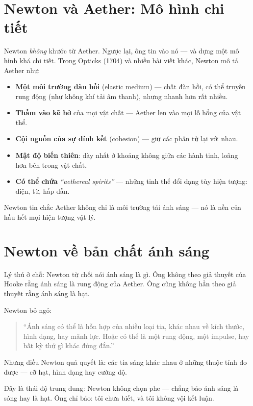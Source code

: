 \section{Newton và Aether: Mô hình chi tiết}

Newton \emph{không} khước từ Aether. Ngược lại, ông tin vào nó — và dựng một mô hình khá chi tiết. Trong Opticks (1704) và nhiều bài viết khác, Newton mô tả Aether như:
\begin{itemize}
  \item \textbf{Một môi trường đàn hồi} (elastic medium) — chất đàn hồi, có thể truyền rung động (như không khí tải âm thanh), nhưng nhanh hơn rất nhiều.
  \item \textbf{Thấm vào kẽ hở} của mọi vật chất — Aether len vào mọi lỗ hổng của vật thể.
  \item \textbf{Cội nguồn của sự dính kết} (cohesion) — giữ các phân tử lại với nhau.
  \item \textbf{Mật độ biến thiên}: dày nhất ở khoảng không giữa các hành tinh, loãng hơn bên trong vật chất.
  \item \textbf{Có thể chứa} \emph{``aethereal spirits''} — những tinh thể đổi dạng tùy hiện tượng: điện, từ, hấp dẫn.
\end{itemize}

Newton tin chắc Aether không chỉ là môi trường tải ánh sáng — nó là nền của hầu hết mọi hiện tượng vật lý.


\section{Newton về bản chất ánh sáng}

Lý thú ở chỗ: Newton từ chối nói ánh sáng là gì. Ông không theo giả thuyết của Hooke rằng ánh sáng là rung động của Aether. Ông cũng không hẳn theo giả thuyết rằng ánh sáng là hạt.

Newton bỏ ngỏ:
\begin{quote}
“Ánh sáng có thể là hỗn hợp của nhiều loại tia, khác nhau về kích thước, hình dạng, hay mãnh lực. Hoặc có thể là một rung động, một impulse, hay bất kỳ thứ gì khác đúng đắn.”
\end{quote}

Nhưng điều Newton quả quyết là: các tia sáng khác nhau ở những thuộc tính đo được — cỡ hạt, hình dạng hay cường độ.

Đây là thái độ trung dung: Newton không chọn phe — chẳng bảo ánh sáng là sóng hay là hạt. Ông chỉ bảo: tôi chưa biết, và tôi không vội kết luận.


